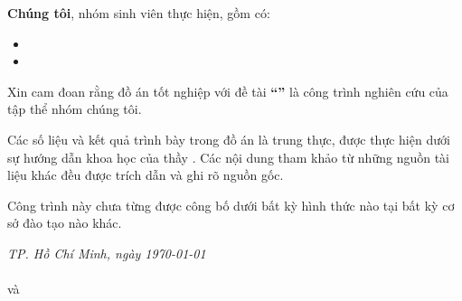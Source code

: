 \begin{declaration}
\setlength{\parskip}{6pt} %

\textbf{Chúng tôi}, nhóm sinh viên thực hiện, gồm có:
\begin{itemize}
    \item [1.] \studentname
    \item [2.] \studentnametwo
\end{itemize}

Xin cam đoan rằng đồ án tốt nghiệp với đề tài \textbf{“\titlethesis”} là công trình nghiên cứu của tập thể nhóm chúng tôi.

Các số liệu và kết quả trình bày trong đồ án là trung thực, được thực hiện dưới sự hướng dẫn khoa học của thầy \textbf{\supervisor}. Các nội dung tham khảo từ những nguồn tài liệu khác đều được trích dẫn và ghi rõ nguồn gốc.

Công trình này chưa từng được công bố dưới bất kỳ hình thức nào tại bất kỳ cơ sở đào tạo nào khác.

\vspace{2cm}

\begin{flushright}
    \textit{TP. Hồ Chí Minh, ngày \today} \\
     \\[2.5cm]

    \textbf{\studentname} và \textbf{\studentnametwo}\\
\end{flushright}
\end{declaration}
